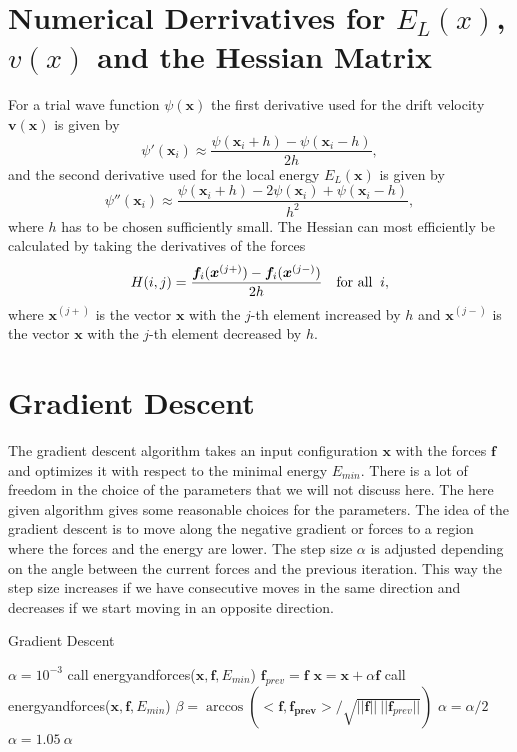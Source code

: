 \documentclass [12pt]{report}
\begin{document}
\begin{appendices}
\chapter{Numerical Derrivatives for $E_L(x)$, $v(x)$ and the Hessian Matrix} \label{appendixC}
For a trial wave function $\psi(\bm{x})$ the first derivative used for the drift velocity $\bm{v}(\bm{x})$ is given by
\begin{equation}
\psi'(\bm{x}_i) \approx \frac{\psi(\bm{x}_i + h) - \psi(\bm{x}_i - h)}{2h},
\end{equation}
and the second derivative used for the local energy $E_L(\bm{x})$ is given by
\begin{equation}
\psi''(\bm{x}_i) \approx \frac{\psi(\bm{x}_i + h) - 2 \psi(\bm{x}_i) + \psi(\bm{x}_i - h)}{h^2},
\end{equation}
where $h$ has to be chosen sufficiently small.
The Hessian can most efficiently be calculated by taking the derivatives of the forces
\begin{equation}
H(i,j) = \frac{\bm{f}_i(\bm{x}^{(j+)}) - \bm{f}_i(\bm{x}^{(j-)})}{2h} \mbox{\quad for all \:} i,
\end{equation}
where $\bm{x}^{(j+)}$ is the vector $\bm{x}$ with the $j$-th element increased by $h$ and $\bm{x}^{(j-)}$ is the vector $\bm{x}$ with the $j$-th element decreased by $h$.
\chapter{Gradient Descent} \label{gradient_descent}
The gradient descent algorithm takes an input configuration $\bm{x}$ with the forces $\bm{f}$ and optimizes it with respect to the minimal energy $E_{min}$. There is a lot of freedom in the choice of the parameters that we will not discuss here. The here given algorithm gives some reasonable choices for the parameters. The idea of the gradient descent is to move along the negative gradient or forces to a region where the forces and the energy are lower. The step size $\alpha$ is adjusted depending on the angle between the current forces and the previous iteration. This way the step size increases if we have consecutive moves in the same direction and decreases if we start moving in an opposite direction. 
\begin{algorithm}
\caption{Gradient Descent}\label{grad_desc}
\begin{algorithmic}[1]
 
\State $\alpha = 10^{-3}$
\State call energyandforces($\bm{x}, \bm{f}, E_{min}$)
 
	\State $\bm{f}_{prev} = \bm{f}$	
	\State $\bm{x} = \bm{x} + \alpha \bm{f}$
	\State call energyandforces($\bm{x}, \bm{f}, E_{min}$)
	\State $\beta = \arccos{(<\bm{f},\bm{f_{prev}}>/\sqrt{||\bm{f}||\:||\bm{f}_{prev}||})}$ 
	 
		\State $\alpha = \alpha/2$
	\Else
		\State $\alpha = 1.05\ \alpha$
	\EndIf
\EndWhile
\EndProcedure
\end{algorithmic}
\end{algorithm}


\end{appendices}
\end{document}
